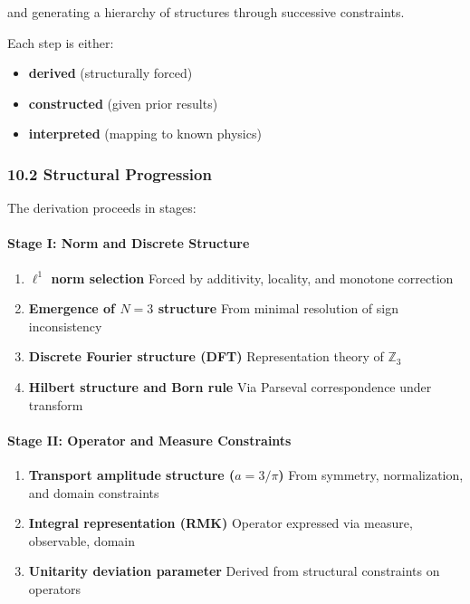\documentclass[
]{article}
\providecommand{\tightlist}{%
  \setlength{\itemsep}{0pt}\setlength{\parskip}{0pt}}
\begin{document}
and generating a hierarchy of structures through successive constraints.

Each step is either:

\begin{itemize}
\tightlist
\item
  \textbf{derived} (structurally forced)
\item
  \textbf{constructed} (given prior results)
\item
  \textbf{interpreted} (mapping to known physics)
\end{itemize}

\subsubsection{10.2 Structural
Progression}\label{structural-progression}

The derivation proceeds in stages:

\paragraph{Stage I: Norm and Discrete
Structure}\label{stage-i-norm-and-discrete-structure}

\begin{enumerate}
\def\labelenumi{\arabic{enumi}.}
\item
  \textbf{\(\ell^1\) norm selection} Forced by additivity, locality, and
  monotone correction
\item
  \textbf{Emergence of \(N = 3\) structure} From minimal resolution of
  sign inconsistency
\item
  \textbf{Discrete Fourier structure (DFT)} Representation theory of
  \(\mathbb{Z}_3\)
\item
  \textbf{Hilbert structure and Born rule} Via Parseval correspondence
  under transform
\end{enumerate}

\paragraph{Stage II: Operator and Measure
Constraints}\label{stage-ii-operator-and-measure-constraints}

\begin{enumerate}
\def\labelenumi{\arabic{enumi}.}
\setcounter{enumi}{4}
\item
  \textbf{Transport amplitude structure (\(a = 3/\pi\))} From symmetry,
  normalization, and domain constraints
\item
  \textbf{Integral representation (RMK)} Operator expressed via measure,
  observable, domain
\item
  \textbf{Unitarity deviation parameter} Derived from structural
  constraints on operators
\end{enumerate}
\end{document}
